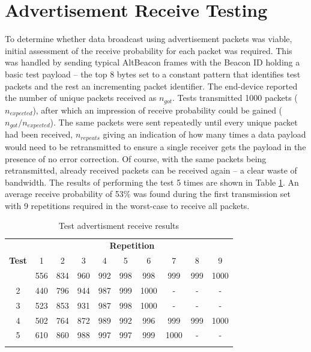 \documentclass[conference]{IEEEtran} %
\begin{document}
\section{Advertisement Receive Testing}
To determine whether data broadcast using advertisement packets was viable, initial assessment of the receive probability for each packet was required. This was handled by sending typical AltBeacon frames with the Beacon ID holding a basic test payload -- the top 8 bytes set to a constant pattern that identifies test packets and the rest an incrementing packet identifier. The end-device reported the number of unique packets received as $n_{got}$. Tests transmitted 1000 packets ($n_{expected}$), after which an impression of receive probability could be gained ($n_{got} / n_{expected}$). The same packets were sent repeatedly until every unique packet had been received, $n_{repeats}$ giving  an indication of how many times a data payload would need to be retransmitted to ensure a single receiver gets the payload in the presence of no error correction. Of course, with the same packets being retransmitted, already received packets can be received again -- a clear waste of bandwidth. The results of performing the test 5 times are shown in Table \ref{tab:receive_prob}. An average receive probability of 53\% was found during the first transmission set with 9 repetitions required in the worst-case to receive all packets.

\begin{table}[htbp]
\caption{Test advertisment receive results}
\begin{center}
\begin{tabular}{c|ccccccccc}
\toprule
   & \multicolumn{9}{c}{\textbf{Repetition}} \\
\textbf{Test} & 1 & 2 & 3 & 4 & 5 & 6 & 7 & 8 & 9 \\
\midrule\addlinespace
1 & 556 & 834 & 960 & 992 & 998 & 998 & 999 & 999 & 1000 \\
2 & 440 & 796 & 944 & 987 & 999 & 1000 & - & - & -  \\
3 & 523 & 853 & 931 & 987 & 998 & 1000 & - & - & - \\
4 & 502 & 764 & 872 & 989 & 992 & 996 & 999 & 999 & 1000 \\
5 & 610 & 860 & 988 & 997 & 997 & 999 & 1000 & - & -  \\
\addlinespace\bottomrule
\end{tabular}
\end{center}
\label{tab:receive_prob}
\end{table}
\end{document}
